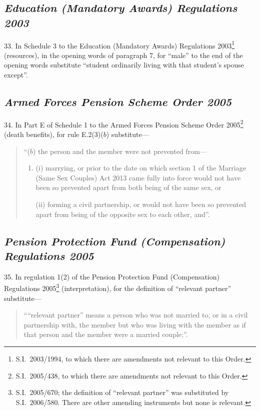 \documentclass[12pt,a4paper]{article}
\begin{document}
\subsection*{\itshape Education (Mandatory Awards) Regulations 2003}

33.  In Schedule 3 to the Education (Mandatory Awards) Regulations 2003\footnote{S.I.~2003/1994, to which there are amendments not relevant to this Order.} (resources), in the opening words of paragraph 7, for “male” to the end of the opening words substitute “student ordinarily living with that student’s spouse except”.

\subsection*{\itshape Armed Forces Pension Scheme Order 2005}

34.  In Part E of Schedule 1 to the Armed Forces Pension Scheme Order 2005\footnote{S.I.~2005/438, to which there are amendments not relevant to this Order.} (death benefits), for rule E.2(3)($b$)  substitute—
\begin{quotation}
“($b$) the person and the member were not prevented from—
\begin{enumerate}\item[]
(i) marrying, or prior to the date on which section 1 of the Marriage (Same Sex Couples) Act 2013 came fully into force would not have been so prevented apart from both being of the same sex, or

(ii) forming a civil partnership, or would not have been so prevented apart from being of the opposite sex to each other, and”.
\end{enumerate}
\end{quotation}

\subsection*{\itshape Pension Protection Fund (Compensation) Regulations 2005}

35.  In regulation 1(2) of the Pension Protection Fund (Compensation) Regulations 2005\footnote{S.I.~2005/670; the definition of “relevant partner” was substituted by S.I.~2006/580. There are other amending instruments but none is relevant.} (interpretation), for the definition of “relevant partner” substitute—
\begin{quotation}
““relevant partner” means a person who was not married to, or in a civil partnership with, the member but who was living with the member as if that person and the member were a married couple;”.
\end{quotation}
\end{document}
